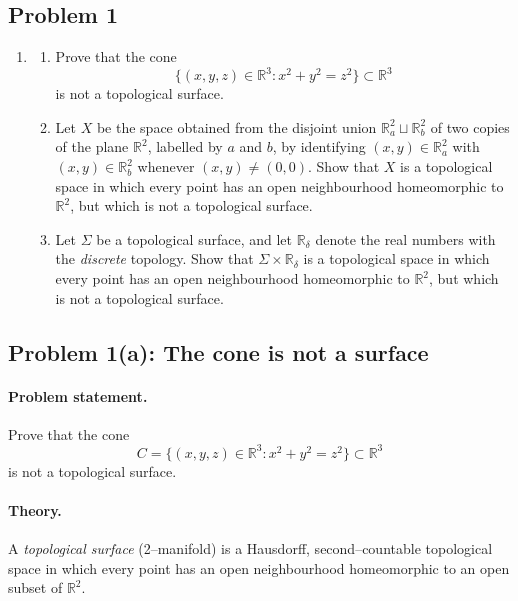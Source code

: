 \documentclass[12pt,a4paper]{article}
\theoremstyle{plain}
\theoremstyle{definition}      %
\begin{document}
\subsection*{Problem 1}


\begin{enumerate}
	\item 
	\begin{enumerate}[label=\textnormal{(\alph*)}]
		\item Prove that the cone
		\[
		\{(x,y,z)\in\mathbb{R}^3 : x^2 + y^2 = z^2\} \subset \mathbb{R}^3
		\]
		is not a topological surface.
		
		\item Let $X$ be the space obtained from the disjoint union 
		$\mathbb{R}^2_a \sqcup \mathbb{R}^2_b$ of two copies of the plane 
		$\mathbb{R}^2$, labelled by $a$ and $b$, by identifying 
		$(x,y)\in\mathbb{R}^2_a$ with $(x,y)\in\mathbb{R}^2_b$ whenever 
		$(x,y)\neq (0,0)$. Show that $X$ is a topological space in which every 
		point has an open neighbourhood homeomorphic to $\mathbb{R}^2$, but which 
		is not a topological surface.
		
		\item Let $\Sigma$ be a topological surface, and let $\mathbb{R}_\delta$ 
		denote the real numbers with the \emph{discrete} topology. Show that 
		$\Sigma\times\mathbb{R}_\delta$ is a topological space in which every point 
		has an open neighbourhood homeomorphic to $\mathbb{R}^2$, but which is not 
		a topological surface.
	\end{enumerate}
\end{enumerate}


\subsection*{Problem 1(a): The cone is not a surface}

\paragraph{Problem statement.}
Prove that the cone
\[
C=\{(x,y,z)\in\mathbb{R}^3 : x^2+y^2=z^2\}\subset\mathbb{R}^3
\]
is not a topological surface.

\paragraph{Theory.}
A \emph{topological surface} (2--manifold) is a Hausdorff, second--countable topological space in which every point has an open neighbourhood homeomorphic to an open subset of $\mathbb{R}^2$.
\end{document}
